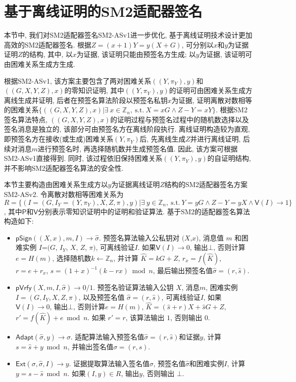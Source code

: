 \documentclass[review]{jcr}
\begin{document}
\section{基于离线证明的SM2适配器签名} 

本节中, 我们对SM2适配器签名SM2-ASv1进一步优化, 基于离线证明技术设计更加高效的SM2适配器签名. 根据$Z=(x+1)Y=y(X+G)$, 可分别以$x$和$y$为证据证明$Z$的结构, 其中, 以$x$为证据, 该证明只能由预签名方生成; 以$y$为证据, 该证明可由困难关系生成方生成. 

根据SM2-ASv1, 该方案主要包含了两对困难关系$((Y, \pi_Y),y)$和$((G,X,Y,Z),x)$的零知识证明, 其中$((Y, \pi_Y),y)$的证明可由困难关系生成方离线生成并证明, 后者在预签名算法阶段以预签名私钥$x$为证据, 证明离散对数相等的困难关系$\{((G,X,Y,Z),x)|\exists\ x\in \mathbb{Z}_n,\ \text{s.t.}\ X=xG \wedge Z-Y=xY\}$. 根据SM2签名算法特点, $((G,X,Y,Z),x)$的证明过程与预签名过程中的随机数选择以及签名消息是独立的, 该部分可由预签名方在离线阶段执行.  离线证明构造较为直观, 即预签名方在接收(或生成)困难关系$(Y,\pi_Y)$后, 先离线生成$Z$并进行离线证明, 后续对消息$m$进行预签名时, 再选择随机数并生成预签名值. 因此, 该方案可根据SM2-ASv1直接得到. 同时, 该过程依旧保持困难关系$((Y,\pi_Y),y)$的自证明结构, 并不影响SM2适配器签名算法的安全性.

本节主要构造由困难关系生成方以$y$为证据离线证明$Z$结构的SM2适配器签名方案SM2-ASv2. 令离散对数相等困难关系为
$R= \{(I=(G,I_Y=(Y,\pi_Y),X,Z,\pi),y)|\exists\ y\in \mathbb{Z}_n,\ \text{s.t.}\ Y = yG \wedge Z-Y = yX\wedge \mathsf{V}(I) \rightarrow 1\}$, 其中$\mathsf{P}$和$\mathsf{V}$分别表示零知识证明中的证明和验证算法. 基于SM2的适配器签名算法构造如下: 

\begin{itemize}
\item $\mathsf{pSign}((X,x),m,I)\rightarrow \hat{\sigma}$. 预签名算法输入公私钥对 $(X$,$x)$, 消息值 $m$ 和困难实例 $I$=$(G$, $I_Y$, $X$, $Z$, $\pi)$, 可离线验证$I$. 如果$\mathsf{V}(I)\rightarrow 0$, 输出$\bot$, 否则计算 $e=H(m)$, 选择随机数$k\leftarrow \mathbb{Z}_n$, 并计算 $\hat{K}=kG+Z$, $r_x=f(\hat{K})$, $r=e+r_x$, $\hat{s}=(1+x)^{-1}(k-rx) \bmod n$, 最后输出预签名值$\hat{\sigma}=(r,\hat{s})$.

\item $\mathsf{pVrfy}(X,m,I,\hat{\sigma})\rightarrow 0/1$. 预签名验证算法输入公钥 $X$, 消息$m$, 困难实例$I=(G,I_Y,X,Z,\pi)$, 以及预签名值 $\hat{\sigma}=(r,\hat{s})$, 可离线验证$I$, 如果$\mathsf{V}(I)\rightarrow 0$, 输出$\bot$,  否则计算$e=H(m)$, $\hat{K}=(\hat{s}+r)X+\hat{s}G+Z$, $r'=f(\hat{K})+e \bmod n$. 如果 $r'=r$, 该算法输出 $1$, 否则输出 $0$. 

\item $\mathsf{Adapt}(\hat{\sigma},y)\rightarrow \sigma$. 适配算法输入预签名值$\hat{\sigma}=(r,\hat{s})$和证据$y$, 计算$s=\hat{s}+y \bmod n$, 并输出签名值$\sigma=(r,s)$. 

\item $\mathsf{Ext}(\sigma,\hat{\sigma},I)\rightarrow y$. 证据提取算法输入签名值$\sigma$, 预签名值$\hat{\sigma}$和困难实例$I$, 计算$y=s-\hat{s} \bmod n$. 如果$(I, y)\in R$, 输出$y$, 否则输出 $\bot$. 
\end{itemize}
\end{document}
